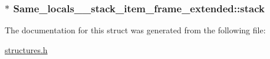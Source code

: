 \subsubsection[{\texorpdfstring{stack}{stack}}]{$\ast$ Same\+\_\+locals\+\_\+\_\+stack\+\_\+item\+\_\+frame\+\_\+extended\+::stack}\hypertarget{structSame__locals__1__stack__item__frame__extended_a7900584b7fadb413da796fbd30c1fa2b}{}\label{structSame__locals__1__stack__item__frame__extended_a7900584b7fadb413da796fbd30c1fa2b}


The documentation for this struct was generated from the following file\+:\begin{DoxyCompactItemize}
\item 
\hyperlink{structures_8h}{structures.\+h}\end{DoxyCompactItemize}
